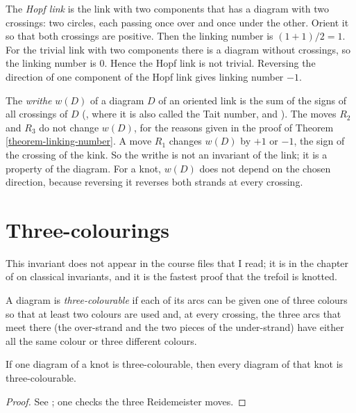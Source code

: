 \begin{example}
\label{example-hopf-link}
The {\it Hopf link} is the link with
two components that has a diagram with
two crossings: two circles, each
passing once over and once under the
other. Orient it so that both crossings
are positive. Then the linking number
is $(1+1)/2=1$. For the trivial link
with two components there is a diagram
without crossings, so the linking
number is $0$. Hence the Hopf link is
not trivial. Reversing the direction of
one component of the Hopf link gives
linking number $-1$.
\end{example}

\noindent
The {\it writhe} $w(D)$ of a diagram
$D$ of an oriented link is the sum of
the signs of all crossings of $D$
(\cite[Definition 4.5.2]{murasugi},
where it is also called the Tait
number, and
\cite[Definition 3.4]{lickorish}).
The moves $R_2$ and $R_3$ do not change
$w(D)$, for the reasons given in the
proof of
Theorem \ref{theorem-linking-number}.
A move $R_1$ changes $w(D)$ by $+1$ or
$-1$, the sign of the crossing of the
kink. So the writhe is not an invariant
of the link; it is a property of the
diagram. For a knot, $w(D)$ does not
depend on the chosen direction, because
reversing it reverses both strands at
every crossing.

\section{Three-colourings}
\label{section-three-colourings}

\noindent
This invariant does not appear in the
course files that I read; it is in the
chapter of \cite{murasugi} on classical
invariants, and it is the fastest proof
that the trefoil is knotted.

\medskip\noindent
A diagram is {\it three-colourable} if
each of its arcs can be given one of
three colours so that at least two
colours are used and, at every
crossing, the three arcs that meet
there (the over-strand and the two
pieces of the under-strand) have either
all the same colour or three different
colours.

\begin{proposition}
\label{proposition-three-colourable}
If one diagram of a knot is
three-colourable, then every diagram of
that knot is three-colourable.
\end{proposition}

\begin{proof}
See \cite[Proposition 4.6.1]{murasugi};
one checks the three Reidemeister
moves.
\end{proof}

